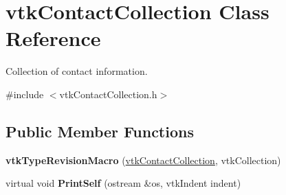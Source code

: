 \hypertarget{classvtkContactCollection}{
\section{vtkContactCollection Class Reference}
\label{classvtkContactCollection}
}


Collection of contact information.  




{\ttfamily \#include $<$vtkContactCollection.h$>$}

\subsection*{Public Member Functions}
\begin{DoxyCompactItemize}
\item 
\hypertarget{classvtkContactCollection_aa1965951c55bd491c4d9fe629da9870b}{
{\bfseries vtkTypeRevisionMacro} (\hyperlink{classvtkContactCollection}{vtkContactCollection}, vtkCollection)}
\label{classvtkContactCollection_aa1965951c55bd491c4d9fe629da9870b}

\item 
\hypertarget{classvtkContactCollection_a0fa034d882bea337b33eee17cee78c18}{
virtual void {\bfseries PrintSelf} (ostream \&os, vtkIndent indent)}
\label{classvtkContactCollection_a0fa034d882bea337b33eee17cee78c18}


\end{DoxyCompactItemize}
